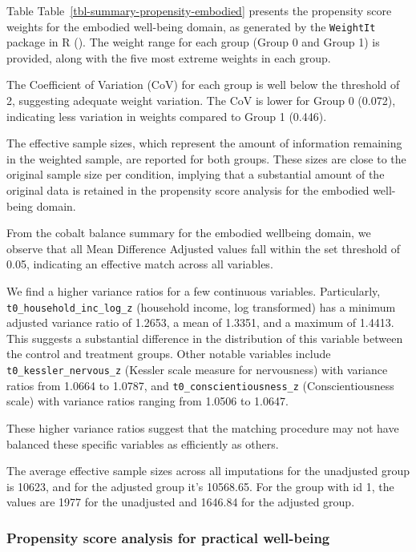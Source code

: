 \documentclass[
  singlecolumn,
  9pt]{article}
\begin{document}
Table Table~\ref{tbl-summary-propensity-embodied} presents the
propensity score weights for the embodied well-being domain, as
generated by the \texttt{WeightIt} package in R
(). The weight
range for each group (Group 0 and Group 1) is provided, along with the
five most extreme weights in each group.

The Coefficient of Variation (CoV) for each group is well below the
threshold of 2, suggesting adequate weight variation. The CoV is lower
for Group 0 (0.072), indicating less variation in weights compared to
Group 1 (0.446).

The effective sample sizes, which represent the amount of information
remaining in the weighted sample, are reported for both groups. These
sizes are close to the original sample size per condition, implying that
a substantial amount of the original data is retained in the propensity
score analysis for the embodied well-being domain.

From the cobalt balance summary for the embodied wellbeing domain, we
observe that all Mean Difference Adjusted values fall within the set
threshold of 0.05, indicating an effective match across all variables.

We find a higher variance ratios for a few continuous variables.
Particularly, \texttt{t0\_household\_inc\_log\_z} (household income, log
transformed) has a minimum adjusted variance ratio of 1.2653, a mean of
1.3351, and a maximum of 1.4413. This suggests a substantial difference
in the distribution of this variable between the control and treatment
groups. Other notable variables include \texttt{t0\_kessler\_nervous\_z}
(Kessler scale measure for nervousness) with variance ratios from 1.0664
to 1.0787, and \texttt{t0\_conscientiousness\_z} (Conscientiousness
scale) with variance ratios ranging from 1.0506 to 1.0647.

These higher variance ratios suggest that the matching procedure may not
have balanced these specific variables as efficiently as others.

The average effective sample sizes across all imputations for the
unadjusted group is 10623, and for the adjusted group it's 10568.65. For
the group with id 1, the values are 1977 for the unadjusted and 1646.84
for the adjusted group.

\subsubsection{Propensity score analysis for practical
well-being}\label{propensity-score-analysis-for-practical-well-being}
\end{document}
